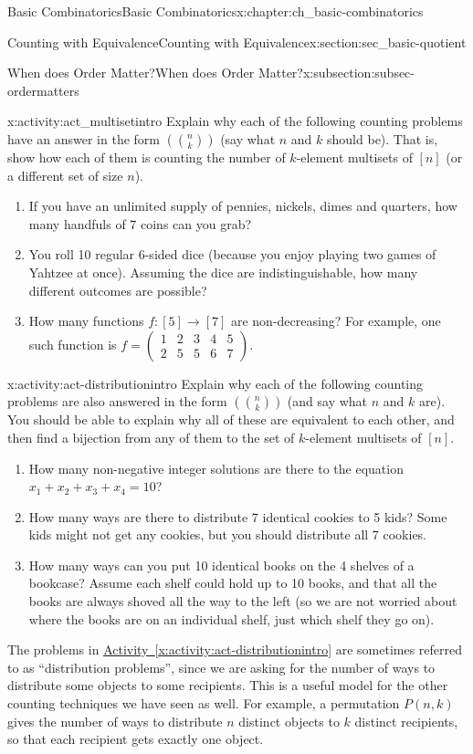 \documentclass[oneside,10pt,]{book}
\numberwithin{equation}{chapter}
\newcommand{\mchoose}[2]{\left(\!\binom{#1}{#2}\!\right)}
\newcommand{\twoline}[2]{\begin{pmatrix}#1 \\ #2 \end{pmatrix}}
\newcommand{\amp}{&}
\begin{document}
\begin{chapterptx}{Basic Combinatorics}{}{Basic Combinatorics}{}{}{x:chapter:ch_basic-combinatorics}
\begin{sectionptx}{Counting with Equivalence}{}{Counting with Equivalence}{}{}{x:section:sec_basic-quotient}
\begin{subsectionptx}{When does Order Matter?}{}{When does Order Matter?}{}{}{x:subsection:subsec-ordermatters}
\begin{activity}{}{x:activity:act_multisetintro}%
Explain why each of the following counting problems have an answer in the form \(\mchoose{n}{k}\) (say what \(n\) and \(k\) should be).  That is, show how each of them is counting the number of \(k\)-element multisets of \([n]\) (or a different set of size \(n\)).%
\begin{enumerate}[font=\bfseries,label=(\alph*),ref=\alph*]
\item{}If you have an unlimited supply of pennies, nickels, dimes and quarters, how many handfuls of 7 coins can you grab?%
\item{}You roll 10 regular 6-sided dice (because you enjoy playing two games of Yahtzee at once).  Assuming the dice are indistinguishable, how many different outcomes are possible?%
\item{}How many functions \(f:[5] \to [7]\) are non-decreasing?  For example, one such function is \(f = \twoline{1 \amp 2 \amp 3 \amp 4 \amp 5}{2 \amp 5 \amp 5 \amp 6 \amp 7}\).%
\end{enumerate}
\end{activity}
\begin{activity}{}{x:activity:act-distributionintro}%
Explain why each of the following counting problems are also answered in the form \(\mchoose{n}{k}\) (and say what \(n\) and \(k\) are).  You should be able to explain why all of these are equivalent to each other, and then find a bijection from any of them to the set of \(k\)-element multisets of \([n]\).%
\begin{enumerate}[font=\bfseries,label=(\alph*),ref=\alph*]
\item{}How many non-negative integer solutions are there to the equation \(x_1 + x_2 + x_3 + x_4 = 10\)?%
\item{}How many ways are there to distribute 7 identical cookies to 5 kids? Some kids might not get any cookies, but you should distribute all 7 cookies.%
\item{}How many ways can you put 10 identical books on the 4 shelves of a bookcase?  Assume each shelf could hold up to 10 books, and that all the books are always shoved all the way to the left (so we are not worried about where the books are on an individual shelf, just which shelf they go on).%
\end{enumerate}
\end{activity}
The problems in \hyperref[x:activity:act-distributionintro]{Activity~\ref{x:activity:act-distributionintro}} are sometimes referred to as ``distribution problems'', since we are asking for the number of ways to distribute some objects to some recipients.   This is a useful model for the other counting techniques we have seen as well.  For example, a permutation \(P(n,k)\) gives the number of ways to distribute \(n\) distinct objects to \(k\) distinct recipients, so that each recipient gets exactly one object.%

\end{subsectionptx}
\end{sectionptx}
\end{chapterptx}
\end{document}
